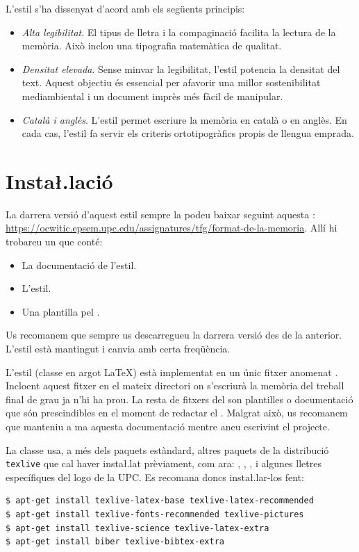 \documentclass{tfgitic}[2024/07/01]
\begin{document}
L'estil s'ha dissenyat d'acord amb els següents principis:
\begin{itemize}
\item \emph{Alta legibilitat}. El tipus de lletra i la compaginació
  facilita la lectura de la memòria. Això inclou una tipografia
  matemàtica de qualitat.
\item \emph{Densitat elevada}. Sense minvar la legibilitat, l'estil
  potencia la densitat del text. Aquest objectiu és essencial per
  afavorir una millor sostenibilitat mediambiental i un document
  imprès més fàcil de manipular.
\item \emph{Català i anglès}. L'estil permet escriure la memòria en
  català o en anglès. En cada cas, l'estil fa servir els criteris
  ortotipogràfics propis de llengua emprada.
\end{itemize}


\section{Insta\l.lació}

La darrera versió d'aquest estil sempre la podeu baixar seguint
aquesta :
\url{https://ocwitic.epsem.upc.edu/assignatures/tfg/format-de-la-memoria}. Allí
hi trobareu un  que conté:
\begin{itemize}
\item La documentació de l'estil.
\item L'estil.
\item Una plantilla pel .
\end{itemize}

Us recomanem que sempre us descarregueu la darrera versió des de la
 anterior. L'estil està mantingut i canvia amb certa
freqüència.

L'estil (classe en argot \LaTeX{}) està implementat en un únic fitxer
anomenat . Incloent aquest fitxer en el mateix
directori on s'escriurà la memòria del treball final de grau ja n'hi
ha prou. La resta de fitxers del  son plantilles o
documentació que són prescindibles en el moment de redactar el
. Malgrat això, us recomanem que manteniu a ma aquesta
documentació mentre aneu escrivint el projecte.

La classe usa, a més dels paquets estàndard, altres paquets de la
distribució \texttt{texlive} que cal haver insta\l.lat prèviament, com
ara: , , ,
 i algunes lletres específiques del logo de la UPC. Es
recomana doncs insta\l.lar-los fent:
\begin{verbatim}
$ apt-get install texlive-latex-base texlive-latex-recommended
$ apt-get install texlive-fonts-recommended texlive-pictures
$ apt-get install texlive-science texlive-latex-extra
$ apt-get install biber texlive-bibtex-extra
\end{verbatim}
\end{document}
